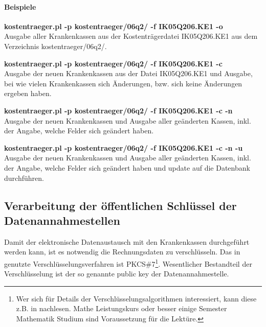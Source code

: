 \paragraph{Beispiele}
\begin{compactdesc}
\item\textbf{kostentraeger.pl -p kostentraeger/06q2/ -f IK05Q206.KE1 -o}\\
Ausgabe aller Krankenkassen aus der Kostenträgerdatei IK05Q206.KE1 aus 
dem Verzeichnis kostentraeger/06q2/.
\item\textbf{kostentraeger.pl -p kostentraeger/06q2/ -f IK05Q206.KE1 -c}\\
Ausgabe der neuen Krankenkassen aus der Datei IK05Q206.KE1 und Ausgabe, bei 
wie vielen Krankenkassen sich Änderungen, bzw. sich keine Änderungen 
ergeben haben.
\item\textbf{ kostentraeger.pl -p kostentraeger/06q2/ -f IK05Q206.KE1 -c -n}\\
Ausgabe der neuen Krankenkassen und Ausgabe aller geänderten Kassen, inkl.
der Angabe, welche Felder sich geändert haben.
\item\textbf{ kostentraeger.pl -p kostentraeger/06q2/ -f IK05Q206.KE1 -c -n -u}\\
Ausgabe der neuen Krankenkassen und Ausgabe aller geänderten Kassen, inkl.
der Angabe, welche Felder sich geändert haben und update auf die
Datenbank durchführen.
\end{compactdesc}


\subsection{Verarbeitung der öffentlichen Schlüssel der
Datenannahmestellen\label{anhang:pubkey}}
Damit der elektronische Datenaustausch mit den Krankenkassen durchgeführt
werden kann, ist es notwendig die Rechnungsdaten zu verschlüsseln.
Das in \tinyHeb\/ genutzte Verschlüsselungsverfahren ist PKCS\#7\footnote{Wer sich für Details der Verschlüsselungsalgorithmen interessiert, kann diese z.B. in \cite{buchmann} nachlesen. Mathe Leistungskurs oder besser einige Semester Mathematik Studium sind Voraussetzung für die Lektüre.}.
Wesentlicher Bestandteil der Verschlüsselung ist der so genannte public
key der Datenannahmestelle.

